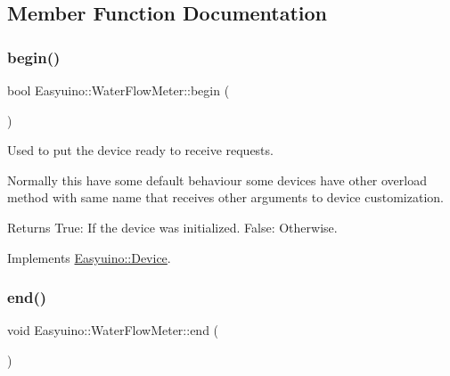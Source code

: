 \subsection{Member Function Documentation}
\mbox{\label{class_easyuino_1_1_water_flow_meter_a400c25b10a7cde45c623805546d071cd}} 
\subsubsection{\texorpdfstring{begin()}{begin()}}
{\footnotesize\ttfamily bool Easyuino\+::\+Water\+Flow\+Meter\+::begin (\begin{DoxyParamCaption}{ }\end{DoxyParamCaption})\hspace{0.3cm}{\ttfamily [virtual]}}



Used to put the device ready to receive requests. 

Normally this have some default behaviour some devices have other overload method with same name that receives other arguments to device customization. \begin{DoxyReturn}{Returns}
True\+: If the device was initialized. False\+: Otherwise. 
\end{DoxyReturn}


Implements \hyperlink{class_easyuino_1_1_device_a2e7bb2fec849719a9d9432b57cdb72ba}{Easyuino\+::\+Device}.

\mbox{\label{class_easyuino_1_1_water_flow_meter_a47024d4da9568e42743a875c08c33121}} 
\subsubsection{\texorpdfstring{end()}{end()}}
{\footnotesize\ttfamily void Easyuino\+::\+Water\+Flow\+Meter\+::end (\begin{DoxyParamCaption}{ }\end{DoxyParamCaption})\hspace{0.3cm}{\ttfamily [virtual]}}




